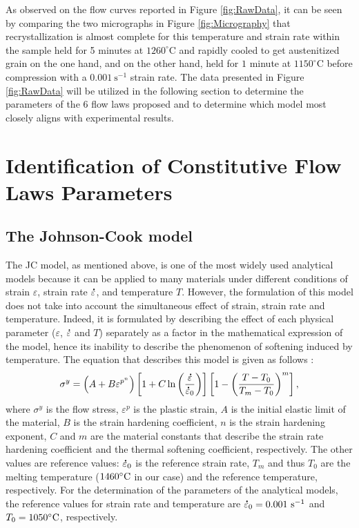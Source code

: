 \documentclass[metals,article,submit,pdftex,moreauthors]{Definitions/mdpi}
\DeclareRobustCommand{\mdot}[1]{\accentset{\mbox{\bfseries .}}{#1}}
\DeclareRobustCommand{\ps}{\text{s}^{-1}}
\begin{document}
As observed on the flow curves reported in Figure \ref{fig:RawData}, it can be seen by comparing the two micrographs in Figure \ref{fig:Micrography} that recrystallization is almost complete for this temperature and strain rate within the sample held for 5 minutes at $1260^\circ$C and rapidly cooled to get austenitized grain on the one hand, and on the other hand, held for $1$ minute at $1150^\circ$C before compression with a $0.001~\text{s}^{-1}$ strain rate.
The data presented in Figure \ref{fig:RawData} will be utilized in the following section to determine the parameters of the $6$ flow laws proposed and to determine which model most closely aligns with experimental results.

\section{Identification of Constitutive Flow Laws Parameters\label{sec:ConstLaws}}
\subsection{The Johnson-Cook model\label{sec:JC}}

The JC model, as mentioned above, is one of the most widely used analytical models because it can be applied to many materials under different conditions of strain $\varepsilon$, strain rate $\mdot\varepsilon$, and temperature $T$.
However, the formulation of this model does not take into account the simultaneous effect of strain, strain rate and temperature.
Indeed, it is formulated by describing the effect of each physical parameter ($\varepsilon$, $\mdot\varepsilon$ and $T$) separately as a factor in the mathematical expression of the model, hence its inability to describe the phenomenon of softening induced by temperature.
The equation that describes this model is given as follows \cite{Johnson-1983}:
\begin{equation}
\sigma^y=\left(A+B\varepsilon^{p^{n}}\right) \left[1+C\ln\left(\frac{\mdot\varepsilon}{\mdot\varepsilon_0}\right)\right] \left[1-\left(\frac{T-T_0}{T_m-T_0}\right)^{m}\right],\label{eq:Johnson-Cook}
\end{equation}
where $\sigma^y$ is the flow stress, $\varepsilon^p$ is the plastic strain, $A$ is the initial elastic limit of the material, $B$ is the strain hardening coefficient, $n$ is the strain hardening exponent, $C$ and $m$ are the material constants that describe the strain rate hardening coefficient and the thermal softening coefficient, respectively.
The other values are reference values: $\mdot\varepsilon_0$ is the reference strain rate, $T_m$ and thus $T_0$ are the melting temperature ($1460\celsius$ in our case) and the reference temperature, respectively.
For the determination of the parameters of the analytical models, the reference values for strain rate and temperature are $\mdot\varepsilon_0=0.001~\ps$ and $T_0=1050\celsius$, respectively.
\end{document}
